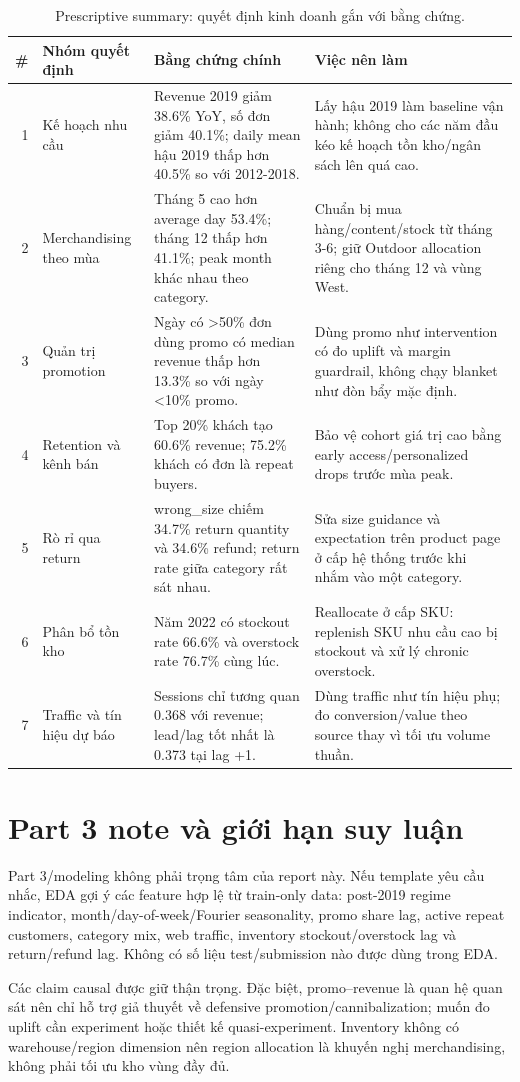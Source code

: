 \documentclass{article}
\begin{document}
\begin{table}[H]
\caption{Prescriptive summary: quyết định kinh doanh gắn với bằng chứng.}
\centering
\scriptsize
\begin{tabularx}{\linewidth}{r l X X}
\toprule
\# & Nhóm quyết định & Bằng chứng chính & Việc nên làm \\
\midrule
1 & Kế hoạch nhu cầu & Revenue 2019 giảm 38.6\% YoY, số đơn giảm 40.1\%; daily mean hậu 2019 thấp hơn 40.5\% so với 2012-2018. & Lấy hậu 2019 làm baseline vận hành; không cho các năm đầu kéo kế hoạch tồn kho/ngân sách lên quá cao. \\
2 & Merchandising theo mùa & Tháng 5 cao hơn average day 53.4\%; tháng 12 thấp hơn 41.1\%; peak month khác nhau theo category. & Chuẩn bị mua hàng/content/stock từ tháng 3-6; giữ Outdoor allocation riêng cho tháng 12 và vùng West. \\
3 & Quản trị promotion & Ngày có >50\% đơn dùng promo có median revenue thấp hơn 13.3\% so với ngày <10\% promo. & Dùng promo như intervention có đo uplift và margin guardrail, không chạy blanket như đòn bẩy mặc định. \\
4 & Retention và kênh bán & Top 20\% khách tạo 60.6\% revenue; 75.2\% khách có đơn là repeat buyers. & Bảo vệ cohort giá trị cao bằng early access/personalized drops trước mùa peak. \\
5 & Rò rỉ qua return & wrong\_size chiếm 34.7\% return quantity và 34.6\% refund; return rate giữa category rất sát nhau. & Sửa size guidance và expectation trên product page ở cấp hệ thống trước khi nhắm vào một category. \\
6 & Phân bổ tồn kho & Năm 2022 có stockout rate 66.6\% và overstock rate 76.7\% cùng lúc. & Reallocate ở cấp SKU: replenish SKU nhu cầu cao bị stockout và xử lý chronic overstock. \\
7 & Traffic và tín hiệu dự báo & Sessions chỉ tương quan 0.368 với revenue; lead/lag tốt nhất là 0.373 tại lag +1. & Dùng traffic như tín hiệu phụ; đo conversion/value theo source thay vì tối ưu volume thuần. \\
\bottomrule
\end{tabularx}
\end{table}

\section{Part 3 note và giới hạn suy luận}
Part 3/modeling không phải trọng tâm của report này. Nếu template yêu cầu nhắc, EDA gợi ý các feature hợp lệ từ train-only data: post-2019 regime indicator, month/day-of-week/Fourier seasonality, promo share lag, active repeat customers, category mix, web traffic, inventory stockout/overstock lag và return/refund lag. Không có số liệu test/submission nào được dùng trong EDA.

Các claim causal được giữ thận trọng. Đặc biệt, promo--revenue là quan hệ quan sát nên chỉ hỗ trợ giả thuyết về defensive promotion/cannibalization; muốn đo uplift cần experiment hoặc thiết kế quasi-experiment. Inventory không có warehouse/region dimension nên region allocation là khuyến nghị merchandising, không phải tối ưu kho vùng đầy đủ.
\end{document}

